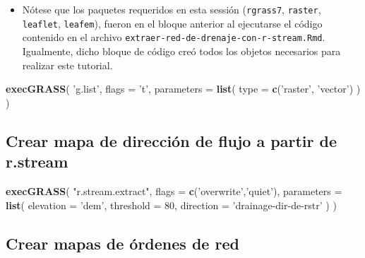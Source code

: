 \documentclass[11pt,]{article}
\newenvironment{Shaded}{\begin{snugshade}}{\end{snugshade}}
\newcommand{\KeywordTok}[1]{\textcolor[rgb]{0.13,0.29,0.53}{\textbf{#1}}}
\newcommand{\DataTypeTok}[1]{\textcolor[rgb]{0.13,0.29,0.53}{#1}}
\newcommand{\DecValTok}[1]{\textcolor[rgb]{0.00,0.00,0.81}{#1}}
\newcommand{\StringTok}[1]{\textcolor[rgb]{0.31,0.60,0.02}{#1}}
\newcommand{\NormalTok}[1]{#1}
\providecommand{\tightlist}{%
\setlength{\itemsep}{0pt}\setlength{\parskip}{0pt}}
\begin{document}
\begin{itemize}
\tightlist
\item
  Nótese que los paquetes requeridos en esta sessión (\texttt{rgrass7},
  \texttt{raster}, \texttt{leaflet}, \texttt{leafem}), fueron en el
  bloque anterior al ejecutarse el código contenido en el archivo
  \texttt{extraer-red-de-drenaje-con-r-stream.Rmd}. Igualmente, dicho
  bloque de código creó todos los objetos necesarios para realizar este
  tutorial.
\end{itemize}

\begin{Shaded}
\begin{Highlighting}[]
\KeywordTok{execGRASS}\NormalTok{(}
  \StringTok{'g.list'}\NormalTok{,}
  \DataTypeTok{flags =} \StringTok{'t'}\NormalTok{,}
  \DataTypeTok{parameters =} \KeywordTok{list}\NormalTok{(}
    \DataTypeTok{type =} \KeywordTok{c}\NormalTok{(}\StringTok{'raster'}\NormalTok{, }\StringTok{'vector'}\NormalTok{)}
\NormalTok{  )}
\NormalTok{)}
\end{Highlighting}
\end{Shaded}

\subsection{Crear mapa de dirección de flujo a partir de
r.stream}\label{crear-mapa-de-direcciuxf3n-de-flujo-a-partir-de-r.stream}

\begin{Shaded}
\begin{Highlighting}[]
\KeywordTok{execGRASS}\NormalTok{(}
  \StringTok{"r.stream.extract"}\NormalTok{,}
  \DataTypeTok{flags =} \KeywordTok{c}\NormalTok{(}\StringTok{'overwrite'}\NormalTok{,}\StringTok{'quiet'}\NormalTok{),}
  \DataTypeTok{parameters =} \KeywordTok{list}\NormalTok{(}
    \DataTypeTok{elevation =} \StringTok{'dem'}\NormalTok{,}
    \DataTypeTok{threshold =} \DecValTok{80}\NormalTok{,}
    \DataTypeTok{direction =} \StringTok{'drainage-dir-de-rstr'}
\NormalTok{  )}
\NormalTok{)}
\end{Highlighting}
\end{Shaded}

\subsection{Crear mapas de órdenes de
red}\label{crear-mapas-de-uxf3rdenes-de-red}
\end{document}
